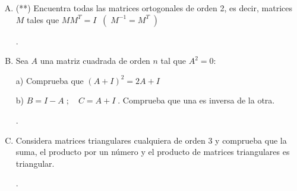 \begin{enumerate}[Q. 1]
.

\item (**) Encuentra todas las matrices ortogonales de orden 2, es decir, matrices $M$ tales que $MM^T=I \;\; (\;M^{-1}=M^T \;)$

.

\item Sea $A$ una matriz cuadrada de orden $n$ tal que $A^2=0$:

a) Comprueba que $(A+I)^2=2A+I$

b) $B=I-A \; ; \quad C=A+I\;$. Comprueba que una es inversa de la otra.

.

\item Considera matrices triangulares cualquiera de orden 3 y comprueba que la suma, el producto por un número y el producto de matrices triangulares es triangular.

.


\end{enumerate}
